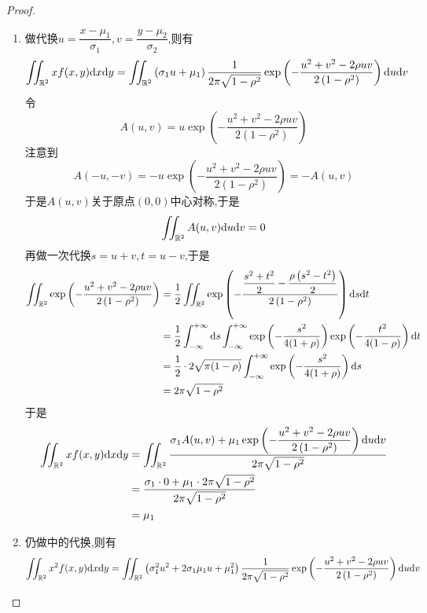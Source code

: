 \documentclass{ctexart}
\begin{document}
\begin{proof}
    \begin{enumerate}[label=\tbf{(\arabic*)}]
        \item 做代换$u=\dfrac{x-\mu_1}{\sigma_1},v=\dfrac{y-\mu_2}{\sigma_2}$,则有
            \[\begin{aligned}
                \iint_{\mathbb{R}^2}xf(x,y)\mathrm{d} x\mathrm{d} y
                &= \iint_{\mathbb{R}^2}\left(\sigma_1 u+\mu_1\right)\dfrac{1}{2\pi\sqrt{1-\rho^2}}\exp\left(-\dfrac{u^2+v^2-2\rho uv}{2\left(1-\rho^2\right)}\right)\mathrm{d} u\mathrm{d} v
            \end{aligned}\]
            令
            \[A(u,v)=u\exp\left(-\dfrac{u^2+v^2-2\rho uv}{2\left(1-\rho^2\right)}\right)\]
            注意到
            \[A(-u,-v)=-u\exp\left(-\dfrac{u^2+v^2-2\rho uv}{2\left(1-\rho^2\right)}\right)=-A(u,v)\]
            于是$A(u,v)$关于原点$(0,0)$中心对称,于是
            \[\iint_{\mathbb{R}^2}A(u,v)\mathrm{d} u\mathrm{d} v=0\]
            再做一次代换$s=u+v,t=u-v$,于是
            \[\begin{aligned}
                \iint_{\mathbb{R}^2}\exp\left(-\dfrac{u^2+v^2-2\rho uv}{2\left(1-\rho^2\right)}\right)
                &= \dfrac12\iint_{\mathbb{R}^2}\exp\left(-\dfrac{\dfrac{s^2+t^2}{2}-\dfrac{\rho\left(s^2-t^2\right)}{2}}{2\left(1-\rho^2\right)}\right)\mathrm{d} s\mathrm{d} t \\
                &= \dfrac12\int_{-\infty}^{+\infty}\mathrm{d} s\int_{-\infty}^{+\infty}\exp\left(-\dfrac{s^2}{4(1+\rho)}\right)\exp\left(-\dfrac{t^2}{4(1-\rho)}\right)\mathrm{d} t \\
                &= \dfrac12\cdot2\sqrt{\pi(1-\rho)}\int_{-\infty}^{+\infty}\exp\left(-\dfrac{s^2}{4(1+\rho)}\right)\mathrm{d} s\\
                &= 2\pi\sqrt{1-\rho^2}
            \end{aligned}\]
            于是
            \[\begin{aligned}
                \iint_{\mathbb{R}^2}xf(x,y)\mathrm{d} x\mathrm{d} y
                &= \iint_{\mathbb{R}^2}\dfrac{\sigma_1A(u,v)+\mu_1\exp\left(-\dfrac{u^2+v^2-2\rho uv}{2\left(1-\rho^2\right)}\right)\mathrm{d} u\mathrm{d} v}{2\pi\sqrt{1-\rho^2}} \\
                &= \dfrac{\sigma_1\cdot0+\mu_1\cdot2\pi\sqrt{1-\rho^2}}{2\pi\sqrt{1-\rho^2}} \\
                &= \mu_1
            \end{aligned}\]
        \item 仍做中的代换,则有
            \[\iint_{\mathbb{R}^2}x^2f(x,y)\mathrm{d} x\mathrm{d} y
            = \iint_{\mathbb{R}^2}\left(\sigma_1^2 u^2+2\sigma_1\mu_1u+\mu_1^2\right)\dfrac{1}{2\pi\sqrt{1-\rho^2}}\exp\left(-\dfrac{u^2+v^2-2\rho uv}{2\left(1-\rho^2\right)}\right)\mathrm{d} u\mathrm{d} v\]

\end{enumerate}
\end{proof}
\end{document}
